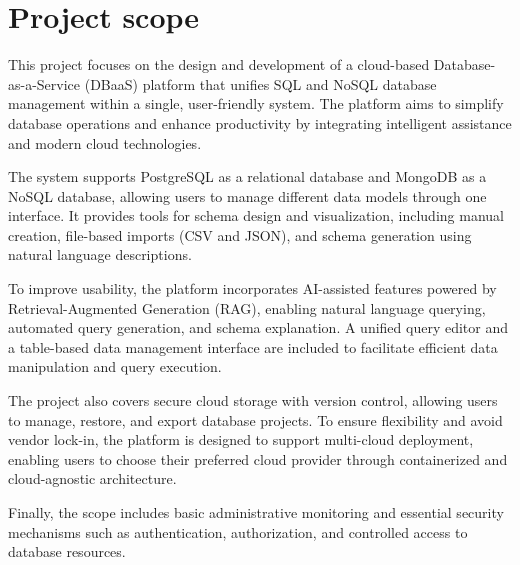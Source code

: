 \section{Project scope}
This project focuses on the design and development of a cloud-based Database-as-a-Service (DBaaS) platform that unifies SQL and NoSQL database management within a single, user-friendly system. The platform aims to simplify database operations and enhance productivity by integrating intelligent assistance and modern cloud technologies.

The system supports PostgreSQL as a relational database and MongoDB as a NoSQL database, allowing users to manage different data models through one interface. It provides tools for schema design and visualization, including manual creation, file-based imports (CSV and JSON), and schema generation using natural language descriptions.

To improve usability, the platform incorporates AI-assisted features powered by Retrieval-Augmented Generation (RAG), enabling natural language querying, automated query generation, and schema explanation. A unified query editor and a table-based data management interface are included to facilitate efficient data manipulation and query execution.

The project also covers secure cloud storage with version control, allowing users to manage, restore, and export database projects. To ensure flexibility and avoid vendor lock-in, the platform is designed to support multi-cloud deployment, enabling users to choose their preferred cloud provider through containerized and cloud-agnostic architecture.

Finally, the scope includes basic administrative monitoring and essential security mechanisms such as authentication, authorization, and controlled access to database resources.